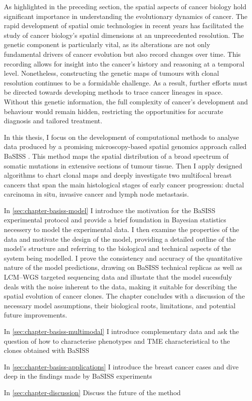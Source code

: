 As highlighted in the preceding section, the spatial aspects of cancer biology hold significant importance in understanding the evolutionary dynamics of cancer. The rapid development of spatial omic technologies in recent years has facilitated the study of cancer biology's spatial dimensions at an unprecedented resolution. The genetic component is particularly vital, as its alterations are not only fundamental drivers of cancer evolution but also record changes over time. This recording allows for insight into the cancer's history and reasoning at a temporal level. Nonetheless, constructing the genetic maps of tumours with clonal resolution continues to be a formidable challenge. As a result, further efforts must be directed towards developing methods to trace cancer lineages in space. Without this genetic information, the full complexity of cancer's development and behaviour would remain hidden, restricting the opportunities for accurate diagnosis and tailored treatment.

In this thesis, I focus on the development of computational methods to analyse data produced by a promising microscopy-based spatial genomics approach called \acf{BaSISS} \parencite{Lomakin2022-ks}. This method maps the spatial distribution of a broad spectrum of somatic mutations in extensive sections of tumour tissue. Then I apply designed algorithms to chart clonal maps and deeply investigate two multifocal breast cancers that span the main histological stages of early cancer progression: ductal carcinoma in situ, invasive cancer and lymph node metastasis. 

In \cref{sec:chapter-basiss-model} I introduce the motivation for the \ac{BaSISS} experimental protocol and provide a brief foundation in Bayesian statistics necessery to model the experimental data. I then examine the properties of the data and motivate the design of the model, providing a detailed outline of the model's structure and referring to the biological and technical aspects of the system being modelled. I prove the consistency and accuracy of the quantitative nature of the model predictions, drawing on \ac{BaSISS} technical replicas as well as \ac{LCM}–\ac{WGS} targeted sequencing data and illustate that the model sucessfuly deals with the noise inherent to the data, making it suitable for describing the spatial evolution of cancer clones. The chapter concludes with a discussion of the necessary model assumptions, their biological roots, limitations, and potential future improvements.

In \cref{sec:chapter-basiss-multimodal} I introduce complementary data and ask the question of how to characterise phenotypes and TME characteristical to the clones obtained with BaSISS 

In \cref{sec:chapter-basiss-applications} I introduce the breast cancer cases and dive deep in the findings made by BaSISS experiments

In \cref{sec:chapter-discussion} Discuss the future of the method









